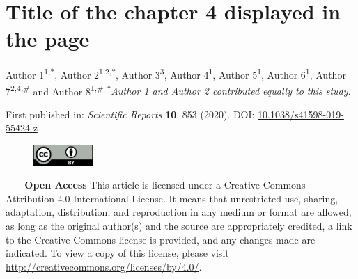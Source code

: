 \chapter[Title of the chapter 4 displayed \\ in the table of contents]
    {Title of the chapter 4 displayed in the page
    }
\label{ch:labelchapter4}

\updatemylof %

\regularsection
\headerregularsection

Author 1\textsuperscript{1,\textcolor{sophia}{$\ast$}}, Author 2\textsuperscript{1,2,\textcolor{sophia}{$\ast$}}, Author 3\textsuperscript{3}, Author 4\textsuperscript{1}, Author 5\textsuperscript{1}, Author 6\textsuperscript{1}, Author 7\textsuperscript{2,4,\#} and Author 8\textsuperscript{1,\#} \hfill \textcolor{sophia}{\textsuperscript{$\ast$}\textit{Author 1 and Author 2 contributed equally to this study.}} \newline

\let\thefootnote\relax{}

\noindent First published in: \textit{Scientific Reports} \textbf{10}, 853 (2020). \hfill \break
DOI: \href{https://doi.org/10.1038/s41598-019-55424-z}{10.1038/s41598-019-55424-z} 

\begin{figure}
    \includegraphics[width=0.2\textwidth]{figures/by.png}
\end{figure} 

\noindent \textcolor{white}{test} \newline \textbf{Open Access} This article is licensed under a Creative Commons Attribution 4.0 International License. It means that unrestricted use, sharing, adaptation, distribution, and reproduction in any medium or format are allowed, as long as the original author(s) and the source are appropriately credited, a link to the Creative Commons license is provided, and any changes made are indicated. To view a copy of this license, please visit \href{http://creativecommons.org/licenses/by/4.0/}{http://creativecommons.org/licenses/by/4.0/}. \newline

